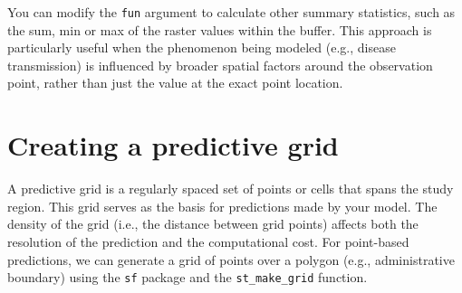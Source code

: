 \documentclass[
  letterpaper,
]{krantz}
\newenvironment{Shaded}{\begin{snugshade}}{\end{snugshade}}
\newcommand{\AttributeTok}[1]{\textcolor[rgb]{0.13,0.29,0.53}{#1}}
\newcommand{\CommentTok}[1]{\textcolor[rgb]{0.56,0.35,0.01}{\textit{#1}}}
\newcommand{\DecValTok}[1]{\textcolor[rgb]{0.00,0.00,0.81}{#1}}
\newcommand{\FunctionTok}[1]{\textcolor[rgb]{0.13,0.29,0.53}{\textbf{#1}}}
\newcommand{\NormalTok}[1]{#1}
\newcommand{\OtherTok}[1]{\textcolor[rgb]{0.56,0.35,0.01}{#1}}
\newcommand{\SpecialCharTok}[1]{\textcolor[rgb]{0.81,0.36,0.00}{\textbf{#1}}}
\newcommand{\StringTok}[1]{\textcolor[rgb]{0.31,0.60,0.02}{#1}}
\begin{document}
You can modify the \texttt{fun} argument to calculate other summary
statistics, such as the sum, min or max of the raster values within the
buffer. This approach is particularly useful when the phenomenon being
modeled (e.g., disease transmission) is influenced by broader spatial
factors around the observation point, rather than just the value at the
exact point location.

\section{Creating a predictive grid}\label{creating-a-predictive-grid}

A predictive grid is a regularly spaced set of points or cells that
spans the study region. This grid serves as the basis for predictions
made by your model. The density of the grid (i.e., the distance between
grid points) affects both the resolution of the prediction and the
computational cost. For point-based predictions, we can generate a grid
of points over a polygon (e.g., administrative boundary) using the
\texttt{sf} package and the \texttt{st\_make\_grid} function.

\begin{Shaded}
\end{Shaded}
\end{document}
